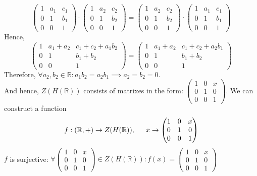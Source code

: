 \documentclass[11pt]{article}
\begin{document}
\[
\begin{pmatrix}
1 & a_1 & c_1 \\
0 & 1 & b_1 \\
0 & 0 & 1
\end{pmatrix} 
\cdot 
\begin{pmatrix}
1 & a_2 & c_2 \\
0 & 1 & b_2 \\
0 & 0 & 1
\end{pmatrix} 
= 
\begin{pmatrix}
1 & a_2 & c_2 \\
0 & 1 & b_2 \\
0 & 0 & 1
\end{pmatrix} 
\cdot 
\begin{pmatrix}
1 & a_1 & c_1 \\
0 & 1 & b_1 \\
0 & 0 & 1
\end{pmatrix}
\]
Hence,
\[
\begin{pmatrix}
1 & a_1 + a_2 & c_1 + c_2 + a_1b_2 \\
0 & 1 & b_1 + b_2 \\
0 & 0 & 1
\end{pmatrix}
=
\begin{pmatrix}
1 & a_1 + a_2 & c_1 + c_2 + a_2b_1 \\
0 & 1 & b_1 + b_2 \\
0 & 0 & 1
\end{pmatrix}
\]
Therefore, $\forall a_2,b_2 \in \mathbb{R}: a_1b_2 = a_2b_1 \implies a_2 = b_2 = 0$. \\
And hence, $Z(H(\mathbb{R}))$ consists of matrixes in the form: $\begin{pmatrix}
1 & 0 & x\\
0 & 1 & 0 \\
0 & 0 & 1
\end{pmatrix}$.
We can construct a function 
\[
f: (\mathbb{R},+) \to Z(H(\mathbb{R})), \indent x \to \begin{pmatrix}
1 & 0 & x \\
0 & 1 & 0 \\
0 & 0 & 1
\end{pmatrix}
\]
$f$ is surjective: $\forall 
\begin{pmatrix}
1 & 0 & x \\
0 & 1 & 0 \\
0 & 0 & 1
\end{pmatrix} 
\in Z(H(\mathbb{R})): f(x) = 
\begin{pmatrix}
1 & 0 & x \\
0 & 1 & 0 \\
0 & 0 & 1
\end{pmatrix}$\\
\end{document}

